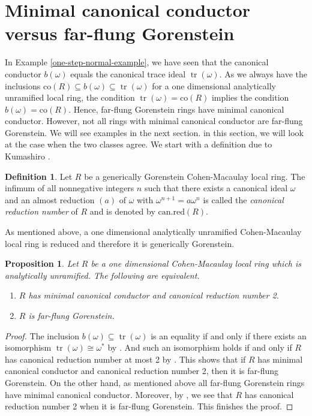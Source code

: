 \documentclass[12pt]{amsart}
\newcommand\co{\mathrm{co}}
\newtheorem{proposition}[theorem]{Proposition}
\theoremstyle{definition}
\newtheorem{definition}[theorem]{Definition}
\DeclareMathOperator{\tr}{\mathrm{tr}}
\begin{document}
    \section{Minimal canonical conductor versus far-flung Gorenstein}
    In Example \ref{one-step-normal-example}, we have seen that the canonical conductor $b(\omega)$ equals the canonical trace ideal $\tr(\omega)$. As we always have the inclusions $\co(R) \subseteq b(\omega) \subseteq \tr(\omega)$ for a one dimensional analytically unramified local ring, the condition $\tr(\omega) = \co(R)$ implies the condition $b(\omega) = \co(R)$. Hence, far-flung Gorenstein rings have minimal canonical conductor. However, not all rings with minimal canonical conductor are far-flung Gorenstein. We will see examples in the next section. in this section, we will look at the case when the two classes agree. We start with a definition due to Kumashiro \cite{Kumashiro}.
\begin{definition}
    Let $R$ be a generically Gorenstein Cohen-Macaulay local ring. The infimum of all nonnegative integers $n$ such that there exists a canonical ideal $\omega$ and an almost reduction $(a)$ of $\omega$ with $\omega^{n+1} = a\omega^n$ is called the \textit{canonical reduction number} of $R$ and is denoted by $\mathrm{can.red}(R)$.   
\end{definition}
As mentioned above, a one dimensional analytically unramified Cohen-Macaulay local ring is reduced and therefore it is generically Gorenstein.
\begin{proposition}
    Let $R$ be a one dimensional Cohen-Macaulay local ring which is analytically unramified. The following are equivalent.
    \begin{enumerate}
        \item $R$ has minimal canonical conductor and canonical reduction number 2.
        \item $R$ is far-flung Gorenstein.
    \end{enumerate} 
\end{proposition}
\begin{proof}
    The inclusion $b(\omega) \subseteq \tr(\omega)$ is an equality if and only if there exists an isomorphism $\tr(\omega) \cong \omega^*$ by \cite[Proposition 4.7]{Dao-Lindo}. And such an isomorphism holds if and only if $R$ has canonical reduction number at most 2 by \cite[Theorem 2.13]{Kumashiro}. This shows that if $R$ has minimal canonical conductor and canonical reduction number 2, then it is far-flung Gorenstein. On the other hand, as mentioned above all far-flung Gorenstein rings have minimal canonical conductor. Moreover, by \cite[Theorem 2.5]{Herzog-Kumashiro-Stamate}, we see that $R$ has canonical reduction number 2 when it is far-flung Gorenstein. This finishes the proof.
\end{proof}
\end{document}
